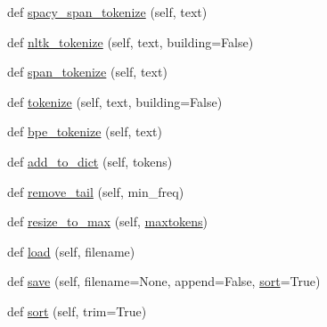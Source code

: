 \begin{DoxyCompactItemize}
\item 
def \hyperlink{classparlai_1_1agents_1_1legacy__agents_1_1seq2seq_1_1dict__v1_1_1DictionaryAgent_a995253a4769e95991e0ba9174a37f6aa}{spacy\+\_\+span\+\_\+tokenize} (self, text)
\item 
def \hyperlink{classparlai_1_1agents_1_1legacy__agents_1_1seq2seq_1_1dict__v1_1_1DictionaryAgent_a63a722c3a9b9ff68a06479e2e6539fd8}{nltk\+\_\+tokenize} (self, text, building=False)
\item 
def \hyperlink{classparlai_1_1agents_1_1legacy__agents_1_1seq2seq_1_1dict__v1_1_1DictionaryAgent_a0927c0c01fe0abd28964a992e42c0548}{span\+\_\+tokenize} (self, text)
\item 
def \hyperlink{classparlai_1_1agents_1_1legacy__agents_1_1seq2seq_1_1dict__v1_1_1DictionaryAgent_af8cf51195d4443615727cf0bdcdace0f}{tokenize} (self, text, building=False)
\item 
def \hyperlink{classparlai_1_1agents_1_1legacy__agents_1_1seq2seq_1_1dict__v1_1_1DictionaryAgent_aab883c9615677cd9ecfa921cd4994081}{bpe\+\_\+tokenize} (self, text)
\item 
def \hyperlink{classparlai_1_1agents_1_1legacy__agents_1_1seq2seq_1_1dict__v1_1_1DictionaryAgent_a684aef1570f33b66b7513119359006c2}{add\+\_\+to\+\_\+dict} (self, tokens)
\item 
def \hyperlink{classparlai_1_1agents_1_1legacy__agents_1_1seq2seq_1_1dict__v1_1_1DictionaryAgent_a77b3d40dd63f7ab22bfc947b343339c7}{remove\+\_\+tail} (self, min\+\_\+freq)
\item 
def \hyperlink{classparlai_1_1agents_1_1legacy__agents_1_1seq2seq_1_1dict__v1_1_1DictionaryAgent_a11701fcf8e4fb57e78fa6a2f4cc29800}{resize\+\_\+to\+\_\+max} (self, \hyperlink{classparlai_1_1agents_1_1legacy__agents_1_1seq2seq_1_1dict__v1_1_1DictionaryAgent_acd57becb3309e84e90cc4ca53dab6512}{maxtokens})
\item 
def \hyperlink{classparlai_1_1agents_1_1legacy__agents_1_1seq2seq_1_1dict__v1_1_1DictionaryAgent_aee99d2e98af6ca938e44daa87d3bee9c}{load} (self, filename)
\item 
def \hyperlink{classparlai_1_1agents_1_1legacy__agents_1_1seq2seq_1_1dict__v1_1_1DictionaryAgent_aacac3c53a7aef02a731d427fcb8bdf87}{save} (self, filename=None, append=False, \hyperlink{classparlai_1_1agents_1_1legacy__agents_1_1seq2seq_1_1dict__v1_1_1DictionaryAgent_aa2697be1f1556da06f77d7eadf7cb9c6}{sort}=True)
\item 
def \hyperlink{classparlai_1_1agents_1_1legacy__agents_1_1seq2seq_1_1dict__v1_1_1DictionaryAgent_aa2697be1f1556da06f77d7eadf7cb9c6}{sort} (self, trim=True)

\end{DoxyCompactItemize}
